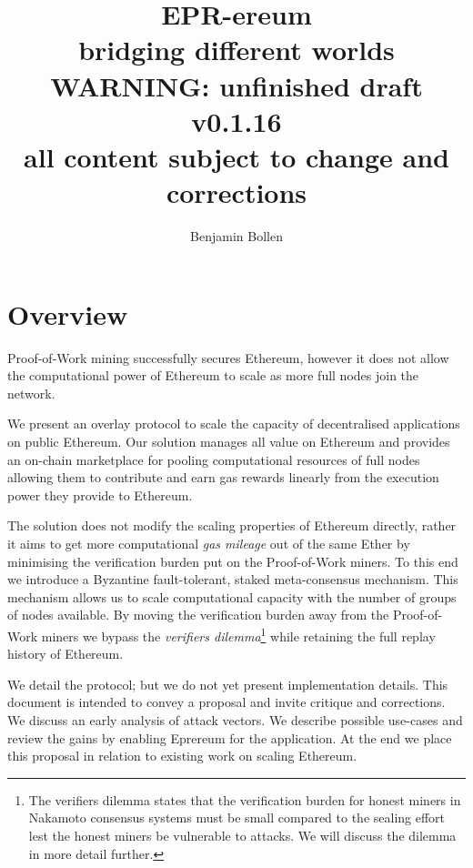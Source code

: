 \documentclass[twocolumn]{article}
\begin{document}
\title{EPR-ereum \\ bridging different worlds \\ \textbf{WARNING: unfinished draft v0.1.16 \\ all content subject to change and corrections}}
\author{Benjamin Bollen}
\maketitle
\section*{Overview}
Proof-of-Work mining successfully secures Ethereum, however it does not allow the computational power of Ethereum to scale as more full nodes join the network.

We present an overlay protocol to scale the capacity of decentralised applications on public Ethereum. Our solution manages all value on Ethereum and provides an on-chain marketplace for pooling computational resources of full nodes allowing them to contribute and earn gas rewards linearly from the execution power they provide to Ethereum.

The solution does not modify the scaling properties of Ethereum directly, rather it aims to get more computational \emph{gas mileage} out of the same Ether by minimising the verification burden put on the Proof-of-Work miners.  To this end we introduce a Byzantine fault-tolerant, staked meta-consensus mechanism. This mechanism allows us to scale computational capacity with the number of groups of nodes available.  By moving the verification burden away from the Proof-of-Work miners we bypass the \emph{verifiers dilemma}\footnote{The verifiers dilemma states that the verification burden for honest miners in Nakamoto consensus systems must be small compared to the sealing effort lest the honest miners be vulnerable to attacks. We will discuss the dilemma in more detail further.} while retaining the full replay history of Ethereum.

We detail the protocol; but we do not yet present implementation details.  This document is intended to convey a proposal and invite critique and corrections.  We discuss an early analysis of attack vectors. We describe possible use-cases and review the gains by enabling Eprereum for the application. At the end we place this proposal in relation to existing work on scaling Ethereum.
\end{document}
